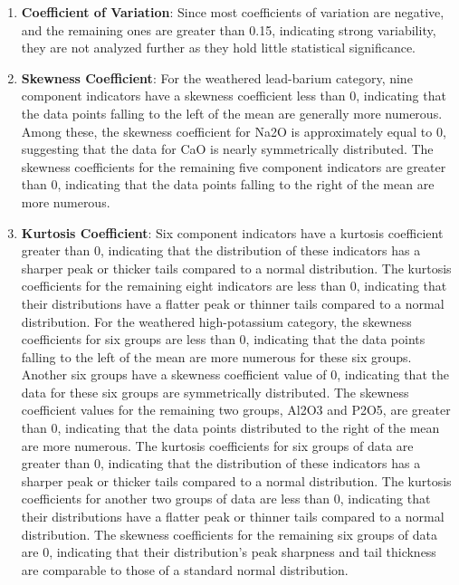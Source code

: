 \documentclass{article}
\begin{document}
	\begin{enumerate}
		\item \textbf{Coefficient of Variation}: Since most coefficients of variation are negative, and the remaining ones are greater than 0.15, indicating strong variability, they are not analyzed further as they hold little statistical significance.
		\item \textbf{Skewness Coefficient}: For the weathered lead-barium category, nine component indicators have a skewness coefficient less than 0, indicating that the data points falling to the left of the mean are generally more numerous. Among these, the skewness coefficient for Na2O is approximately equal to 0, suggesting that the data for CaO is nearly symmetrically distributed. The skewness coefficients for the remaining five component indicators are greater than 0, indicating that the data points falling to the right of the mean are more numerous.
		\item \textbf{Kurtosis Coefficient}: Six component indicators have a kurtosis coefficient greater than 0, indicating that the distribution of these indicators has a sharper peak or thicker tails compared to a normal distribution. The kurtosis coefficients for the remaining eight indicators are less than 0, indicating that their distributions have a flatter peak or thinner tails compared to a normal distribution. For the weathered high-potassium category, the skewness coefficients for six groups are less than 0, indicating that the data points falling to the left of the mean are more numerous for these six groups. Another six groups have a skewness coefficient value of 0, indicating that the data for these six groups are symmetrically distributed. The skewness coefficient values for the remaining two groups, Al2O3 and P2O5, are greater than 0, indicating that the data points distributed to the right of the mean are more numerous. The kurtosis coefficients for six groups of data are greater than 0, indicating that the distribution of these indicators has a sharper peak or thicker tails compared to a normal distribution. The kurtosis coefficients for another two groups of data are less than 0, indicating that their distributions have a flatter peak or thinner tails compared to a normal distribution. The skewness coefficients for the remaining six groups of data are 0, indicating that their distribution's peak sharpness and tail thickness are comparable to those of a standard normal distribution.
	\end{enumerate}
	
	
	
	
\end{document}
